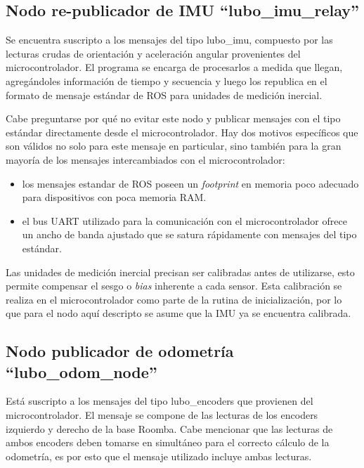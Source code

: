 \subsection{Nodo re-publicador de IMU ``lubo\_imu\_relay''}

Se encuentra suscripto a los mensajes del tipo lubo\_imu, compuesto por las lecturas crudas de orientación y aceleración angular provenientes del microcontrolador. El programa se encarga de procesarlos a medida que llegan, agregándoles información de tiempo y secuencia y luego los republica en el formato de mensaje estándar de ROS para unidades de medición inercial\protect\footnotemark.


Cabe preguntarse por qué no evitar este nodo y publicar mensajes con el tipo estándar directamente desde el microcontrolador. Hay dos motivos específicos que son válidos no solo para este mensaje en particular, sino también para la gran mayoría de los mensajes intercambiados con el microcontrolador:
\begin{itemize}
  \item los mensajes estandar de ROS poseen un \textit{footprint} en memoria poco adecuado para dispositivos con poca memoria RAM.
  \item el bus UART utilizado para la comunicación con el microcontrolador ofrece un ancho de banda ajustado que se satura rápidamente con mensajes del tipo estándar.
\end{itemize}

Las unidades de medición inercial precisan ser calibradas antes de utilizarse, esto permite compensar el sesgo o \textit{bias} inherente a cada sensor. Esta calibración se realiza en el microcontrolador como parte de la rutina de inicialización, por lo que para el nodo aquí descripto se asume que la IMU ya se encuentra calibrada.

\subsection{Nodo publicador de odometría ``lubo\_odom\_node''}

Está suscripto a los mensajes del tipo lubo\_encoders que provienen del microcontrolador. El mensaje se compone de las lecturas de los encoders izquierdo y derecho de la base Roomba. Cabe mencionar que las lecturas de ambos encoders deben tomarse en simultáneo para el correcto cálculo de la odometría, es por esto que el mensaje utilizado incluye ambas lecturas.

